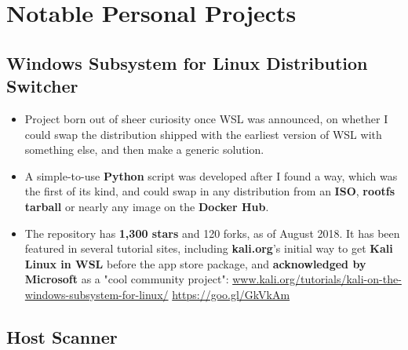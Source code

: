 \documentclass[11pt,a4paper,sans]{moderncv}
\renewcommand*{\httplink}[2][]{%
	\ifthenelse{\equal{#1}{}}%
	{\href{https://#2}{#2}}%
	{\href{https://#2}{#1}}}
\begin{document}

\section{Notable Personal Projects}

	\subsection{Windows Subsystem for Linux Distribution Switcher}
	
	\begin{itemize}
		\item Project born out of sheer curiosity once WSL was announced, on whether I could swap the distribution shipped with the earliest version of WSL with something else, and then make a generic solution.

		\item A simple-to-use \textbf{Python} script was developed after I found a way, which was the first of its kind, and could swap in any distribution from an \textbf{ISO}, \textbf{rootfs tarball} or nearly any image on the \textbf{Docker Hub}.

		\item The repository has \textbf{1,300 stars} and 120 forks, as of August 2018. It has been featured in several tutorial sites, including \textbf{kali.org}'s initial way to get \textbf{Kali Linux in WSL} before the app store package, and \textbf{acknowledged by Microsoft} as a "cool community project": \httplink[https://goo.gl/GkVkAm]{www.kali.org/tutorials/kali-on-the-windows-subsystem-for-linux/}
	\end{itemize}

	\subsection{Host Scanner}
\end{document}
